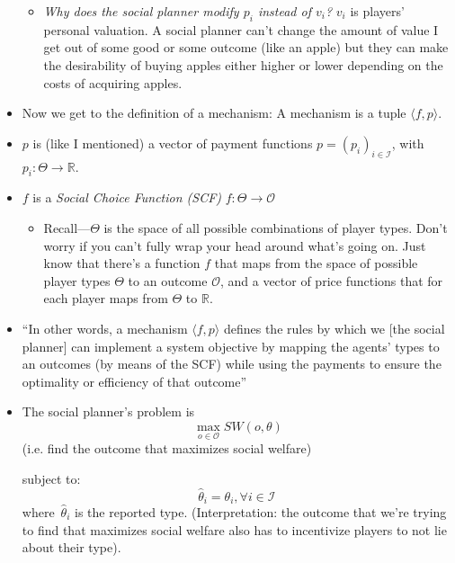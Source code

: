 \documentclass[11pt]{article}
\begin{document}
\begin{itemize}
    \begin{itemize}
        \item {\it Why does the social planner modify $p_i$ instead of $v_i$?} $v_i$ is players' personal valuation. A social planner can't change the amount of value I get out of some good or some outcome (like an apple) but they can make the desirability of buying apples either higher or lower depending on the costs of acquiring apples. 
    \end{itemize}
    \item Now we get to the definition of a mechanism: A mechanism is a tuple $\langle f, p\rangle$. 
    \item $p$ is (like I mentioned) a vector of payment functions $p = (p_i)_{i \in \mathcal{I}}$, with $p_i: \Theta \rightarrow \mathbb{R}$.
    \item $f$ is a {\it Social Choice Function (SCF)} $f : \Theta \rightarrow \mathcal{O}$
    \begin{itemize}
        \item Recall---$\Theta$ is the space of all possible combinations of player types. Don't worry if you can't fully wrap your head around what's going on. Just know that there's a function $f$ that maps from the space of possible player types $\Theta$ to an outcome $\mathcal{O}$, and a vector of price functions that for each player maps from $\Theta$ to $\mathbb{R}$. 
    \end{itemize}
    \item ``In other words, a mechanism $\langle f, p \rangle$ defines the rules by which we [the social planner] can implement a system objective by mapping the agents' types to an outcomes (by means of the SCF) while using the payments to ensure the optimality or efficiency of that outcome''
    \item The social planner's problem is 
    \begin{equation}
        \max_{o \in \mathcal{O}} SW(o, \theta)
    \end{equation}
    (i.e. find the outcome that maximizes social welfare)
    
    subject to:
    \begin{equation}
        \hat{\theta}_i = \theta_i, \forall i \in \mathcal{I}~
    \end{equation}
    where~$\hat{\theta}_i$ is the reported type. (Interpretation: the outcome that we're trying to find that maximizes social welfare also has to incentivize players to not lie about their type).


\end{itemize}
\end{document}
